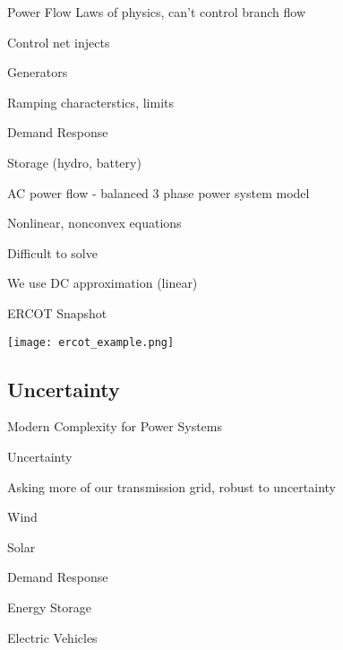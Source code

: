 \begin{frame}{Power Flow}
Laws of physics, can't control branch flow

\alert{Control net injects}
\bi
\item Generators
\bi 
\item Ramping characterstics, limits
\ei
\item Demand Response
\item Storage (hydro, battery)
\ei

\pause

AC power flow - balanced 3 phase power system model 
\bi
\item Nonlinear, nonconvex equations
\item Difficult to solve
\item \alert{We use DC approximation (linear)}
\ei

\end{frame}

\begin{frame}{ERCOT Snapshot}

\vspace{-4cm}
\hspace{-2cm}
\texttt{[image: ercot\_example.png]}
\end{frame}

\subsection{Uncertainty}
\begin{frame}{Modern Complexity for Power Systems}

\alert{Uncertainty}

Asking more of our transmission grid, robust to uncertainty

\bi
\item Wind
\item Solar
\item Demand Response
\item Energy Storage
\item Electric Vehicles
\ei
\end{frame}

